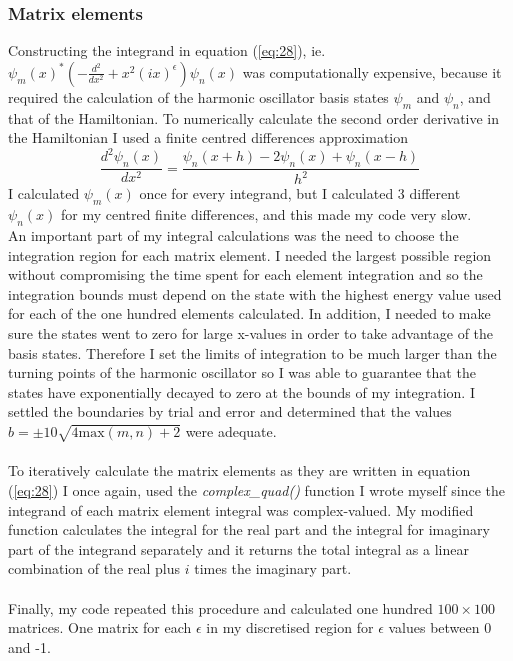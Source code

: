 \documentclass[10pt, a4paper, singlespacing, headsepline]{article}
\begin{document}
\subsubsection{Matrix elements}
Constructing the integrand in equation (\ref{eq:28}), ie. \mbox{$\psi_m(x)^* \left (  - \frac{d^2}{dx^2} + x^2(ix)^{\epsilon}\right ) \psi_n(x)$} was computationally expensive, because it required the calculation of the harmonic oscillator basis states $\psi_m$ and $\psi_n$, and that of the Hamiltonian. To numerically calculate the second order derivative in the Hamiltonian I used a finite centred differences approximation
\begin{equation}\label{eq:29}
\frac{d^2 \psi_n(x)}{dx^2} = \frac{\psi_n(x + h) - 2 \psi_n(x) + \psi_n(x - h)}{h^2}
\end{equation}
I calculated $\psi_m(x)$ once for every integrand, but I calculated 3 different $\psi_n(x)$ for my centred finite differences, and this made my code very slow.\\


An important part of my integral calculations was the need to choose the integration region for each matrix element. I needed the largest possible region without compromising the time spent for each element integration and so the integration bounds must depend on the state with the highest energy value used for each of the one hundred elements calculated. In addition, I needed to make sure the states went to zero for large x-values in order to take advantage of the basis states. Therefore I set the limits of integration to be much larger than the turning points of the harmonic oscillator so I was able to guarantee that the states have exponentially decayed to zero at the bounds of my integration. I settled the boundaries by trial and error and determined that the values $b  = \pm 10\sqrt{4 \mathrm{max}(m,n) + 2}$ were adequate.\\\\
To iteratively calculate the matrix elements as they are written in equation (\ref{eq:28}) I once again, used the \textit{complex\_quad()} function I wrote myself since the integrand of each matrix element integral was complex-valued. My modified function calculates the integral for the real part and the integral for imaginary part of the integrand separately and it returns the total integral as a linear combination of the real plus $i$ times the imaginary part.\\
\\Finally, my code repeated this procedure and calculated one hundred $100\times100$ matrices. One matrix for each $\epsilon$ in my discretised region for $\epsilon$ values between 0 and -1.
\end{document}
